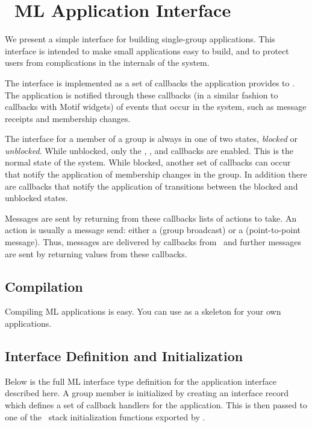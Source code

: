 \section{\ensemble\ ML Application Interface}
\label{section:applintf}

We present a simple interface for building single-group applications.  This
interface is intended to make small applications easy to build, and to protect
users from complications in the internals of the system.

The interface is implemented as a set of callbacks the application provides to
\ensemble.  The application is notified through these callbacks (in a similar
fashion to callbacks with Motif widgets) of events that occur in the system,
such as message receipts and membership changes.

The interface for a member of a group is always in one of two states,
\emph{blocked} or \emph{unblocked}.  While unblocked, only the
, , and  callbacks are
enabled.  This is the normal state of the system.  While blocked, another set
of callbacks can occur that notify the application of membership changes in the
group.  In addition there are callbacks that notify the application of
transitions between the blocked and unblocked states.

Messages are sent by returning from these callbacks lists of actions to
take.  An action is usually a message send: either a  (group
broadcast) or a  (point-to-point message).  Thus, messages are
delivered by callbacks from \ensemble\ and further messages are sent by
returning values from these callbacks.

\subsection{Compilation}
Compiling ML applications is easy.  You can use  as a
skeleton for your own applications.

\subsection{Interface Definition and Initialization}
Below is the full ML interface type definition for the application
interface described here.  A group member is initialized by creating an
interface record which defines a set of callback handlers for the
application.  This is then passed to one of the \ensemble\ stack initialization
functions exported by .

